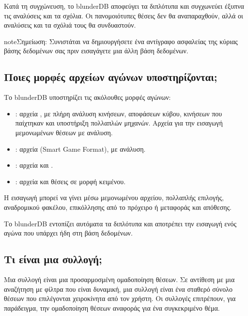 \documentclass[letterpaper,10pt,greek]{sphinxmanual}
\begin{document}
\sphinxAtStartPar
Κατά τη συγχώνευση, το blunderDB αποφεύγει τα διπλότυπα και συγχωνεύει έξυπνα τις αναλύσεις και τα σχόλια. Οι πανομοιότυπες θέσεις δεν θα αναπαραχθούν, αλλά οι αναλύσεις και τα σχόλιά τους θα συνδυαστούν.

\begin{sphinxadmonition}{note}{Σημείωση:}
\sphinxAtStartPar
Συνιστάται να δημιουργήσετε ένα αντίγραφο ασφαλείας της κύριας βάσης δεδομένων σας πριν εισαγάγετε μια άλλη βάση δεδομένων.
\end{sphinxadmonition}


\subsection{Ποιες μορφές αρχείων αγώνων υποστηρίζονται;}
\label{\detokenize{faq:quels-formats-de-fichiers-de-match-sont-supportes}}
\sphinxAtStartPar
Το blunderDB υποστηρίζει τις ακόλουθες μορφές αγώνων:
\begin{itemize}
\item {} 
\sphinxAtStartPar
{}: αρχεία , με πλήρη ανάλυση κινήσεων, αποφάσεων κύβου, κινήσεων που παίχτηκαν και υποστήριξη πολλαπλών μηχανών. Αρχεία  για την εισαγωγή μεμονωμένων θέσεων με ανάλυση.

\item {} 
\sphinxAtStartPar
{}: αρχεία  (Smart Game Format), με ανάλυση.

\item {} 
\sphinxAtStartPar
{}: αρχεία  και .

\item {} 
\sphinxAtStartPar
{}: αρχεία  και θέσεις σε μορφή κειμένου.

\end{itemize}

\sphinxAtStartPar
Η εισαγωγή μπορεί να γίνει μέσω μεμονωμένου αρχείου, πολλαπλής επιλογής, αναδρομικού φακέλου, επικόλλησης από το πρόχειρο ή μεταφοράς και απόθεσης.

\sphinxAtStartPar
Το blunderDB εντοπίζει αυτόματα τα διπλότυπα και αποτρέπει την εισαγωγή ενός αγώνα που υπάρχει ήδη στη βάση δεδομένων.


\subsection{Τι είναι μια συλλογή;}
\label{\detokenize{faq:qu-est-ce-qu-une-collection}}
\sphinxAtStartPar
Μια συλλογή είναι μια προσαρμοσμένη ομαδοποίηση θέσεων. Σε αντίθεση με μια αναζήτηση με φίλτρα που είναι δυναμική, μια συλλογή είναι ένα σταθερό σύνολο θέσεων που επιλέγονται χειροκίνητα από τον χρήστη. Οι συλλογές επιτρέπουν, για παράδειγμα, την ομαδοποίηση θέσεων αναφοράς για ένα συγκεκριμένο θέμα.
\end{document}
